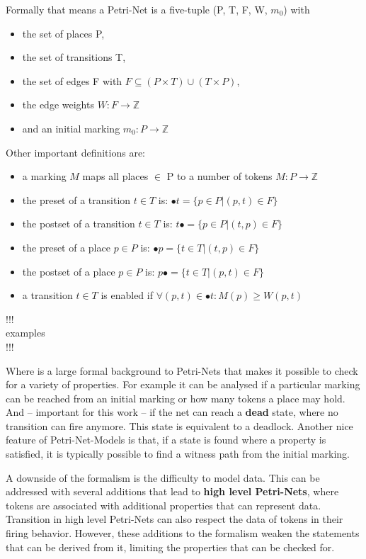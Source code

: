 Formally that means a Petri-Net is a five-tuple (P, T, F, W, $m_0$) with
\begin{itemize}
  \setlength\itemsep{-0.3em}
  \item the set of places P,
  \item the set of transitions T,
  \item the set of edges F with $F \subseteq (P \times T) \cup (T \times P)$,
  \item the edge weights $W: F \rightarrow \mathbb{Z} $
  \item and an initial marking $m_0: P \rightarrow \mathbb{Z} $
\end{itemize}
Other important definitions are:
\begin{itemize}
  \setlength\itemsep{-0.3em}
  \item a marking $M$ maps all places $\in$ P to a number of tokens $M: P \rightarrow \mathbb{Z}$
  \item the preset of a transition $t \in T$ is: $\bullet t = \{p \in P | (p,t) \in F\}$
  \item the postset of a transition $t \in T$ is: $t\bullet = \{p \in P | (t,p) \in F\}$
  \item the preset of a place $p \in P$ is: $\bullet p = \{t \in T | (t,p) \in F\}$
  \item the postset of a place $p \in P$ is: $p\bullet = \{t \in T | (p,t) \in F\}$
  \item a transition $t \in T$ is enabled if $\forall (p,t) \in \bullet t: M(p) \geq W(p,t)$
\end{itemize}
!!!\\
examples\\
!!!

Where is a large formal background to Petri-Nets that makes it possible to check for a variety of properties.
For example it can be analysed if a particular marking can be reached from an initial marking or how many tokens a place may hold.
And -- important for this work -- if the net can reach a \textbf{dead} state, where no transition can fire anymore.
This state is equivalent to a deadlock.
Another nice feature of Petri-Net-Models is that, if a state is found where a property is satisfied, it is typically possible to find a witness path from the initial marking.

A downside of the formalism is the difficulty to model data.
This can be addressed with several additions that lead to \textbf{high level Petri-Nets}, where tokens are associated with additional properties that can represent data.
Transition in high level Petri-Nets can also respect the data of tokens in their firing behavior.
However, these additions to the formalism weaken the statements that can be derived from it, limiting the properties that can be checked for.

